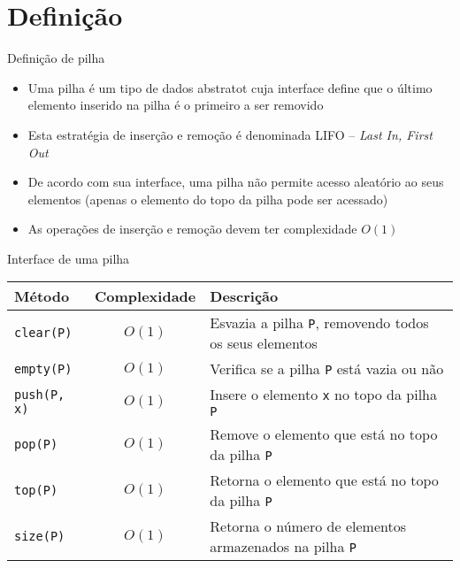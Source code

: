 \section{Definição}

\begin{frame}[fragile]{Definição de pilha}

    \begin{itemize}
        \item Uma pilha é um tipo de dados abstratot cuja interface define que o último elemento
            inserido na pilha é o primeiro a ser removido

        \item Esta estratégia de inserção e remoção é denominada LIFO -- \textit{Last In, First
            Out}

        \item De acordo com sua interface, uma pilha não permite acesso aleatório ao seus
            elementos (apenas o elemento do topo da pilha pode ser acessado)

        \item As operações de inserção e remoção devem ter complexidade $O(1)$

    \end{itemize}

\end{frame}

\begin{frame}[fragile]{Interface de uma pilha}

    \begin{table}
        \centering
        \begin{tabularx}{0.95\textwidth}{lcX}
            \toprule
            \textbf{Método} & \textbf{Complexidade} & \textbf{Descrição} \\
            \midrule
            \texttt{clear(P)} & $O(1)$ & Esvazia a pilha \texttt{P}, removendo todos os seus elementos \\
            \rowcolor[gray]{0.8}
            \texttt{empty(P)} & $O(1)$ & Verifica se a pilha \texttt{P} está vazia ou não \\
            \texttt{push(P, x)} & $O(1)$ & Insere o elemento \texttt{x} no topo da pilha \texttt{P} \\
            \rowcolor[gray]{0.8}
            \texttt{pop(P)} & $O(1)$ & Remove o elemento que está no topo da pilha \texttt{P} \\
            \texttt{top(P)} & $O(1)$ & Retorna o elemento que está no topo da pilha \texttt{P} \\
            \rowcolor[gray]{0.8}
            \texttt{size(P)} & $O(1)$ & Retorna o número de elementos armazenados na pilha \texttt{P} \\
            \bottomrule
        \end{tabularx}
    \end{table}
\end{frame}

